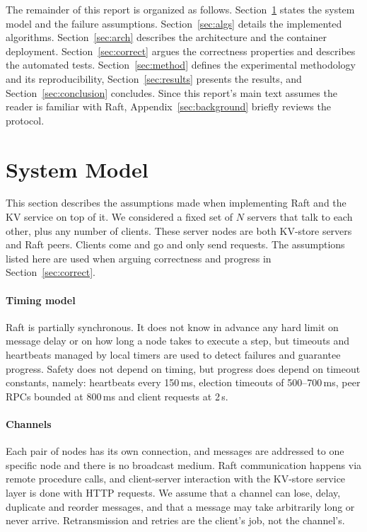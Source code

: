 \documentclass[conference]{IEEEtran}
\begin{document}
The remainder of this report is organized as follows. Section~\ref{sec:model} states the system model and the failure assumptions. Section~\ref{sec:algs} details the implemented algorithms. Section~\ref{sec:arch} describes the architecture and the container deployment. Section~\ref{sec:correct} argues the correctness properties and describes the automated tests.  Section~\ref{sec:method} defines the experimental methodology and its reproducibility, Section~\ref{sec:results} presents the results, and Section~\ref{sec:conclusion} concludes. Since this report's main text assumes the reader is familiar with Raft, Appendix~\ref{sec:background} briefly reviews the protocol.

\section{System Model}
\label{sec:model}
This section describes the assumptions made when implementing Raft and the KV service on top of it. We considered a fixed set of $N$ servers that talk to each other, plus any number of clients. These server nodes are both KV-store servers and Raft peers. Clients come and go and only send requests. The assumptions listed here are used when arguing correctness and progress in Section~\ref{sec:correct}.

\paragraph{Timing model}
Raft is partially synchronous. It does not know in advance any hard limit on message delay or on how long a node takes to execute a step, but timeouts and heartbeats managed by local timers are used to detect failures and guarantee progress. Safety does not depend on timing, but progress does depend on timeout constants, namely: heartbeats every 150\,ms, election timeouts of 500--700\,ms, peer RPCs bounded at 800\,ms and client requests at 2\,s.

\paragraph{Channels}
Each pair of nodes has its own connection, and messages are addressed to one specific node and there is no broadcast medium. Raft communication happens via remote procedure calls, and client-server interaction with the KV-store service layer is done with HTTP requests. We assume that a channel can lose, delay, duplicate and reorder messages, and that a message may take arbitrarily long or never arrive. Retransmission and retries are the client's job, not the channel's. 
\end{document}
